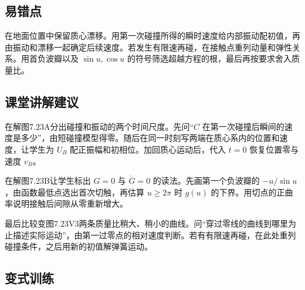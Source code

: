 \documentclass[UTF8,fontset=fandol,a4paper,11pt]{ctexart}
\begin{document}


\subsection*{易错点}

在地面位置中保留质心漂移。用第一次碰撞所得的瞬时速度给内部振动配初值，再由振动和漂移一起确定后续速度。若发生有限速再碰，在接触点重列动量和弹性关系。用首负波瓣以及 $\sin u,\cos u$ 的符号筛选超越方程的根，最后再按要求舍入质量比。




\subsection*{课堂讲解建议}

在解图7.23A分出碰撞和振动的两个时间尺度。先问“$C$ 在第一次碰撞后瞬间的速度是多少”，由短碰撞模型得零。随后在同一时刻写两端在质心系内的位置和速度，让学生为 $U_B$ 配正振幅和初相位。加回质心运动后，代入 $t=0$ 恢复位置零与速度 $v_B$。

在解图7.23B让学生标出 $G=0$ 与 $\dot G=0$ 的读法。先画第一个负波瓣的 $-u/\sin u$，由函数最低点选出首次切触，再估算 $u\ge2\pi$ 时 $g(u)$ 的下界。用切点的正曲率说明接触后间隙从零重新增大。

最后比较变图7.23V3两条质量比稍大、稍小的曲线。问“穿过零线的曲线到哪里为止描述实际运动”，由第一过零点的相对速度判断。若有有限速再碰，在此处重列碰撞条件，之后用新的初值解弹簧运动。




\subsection*{变式训练}
\end{document}
